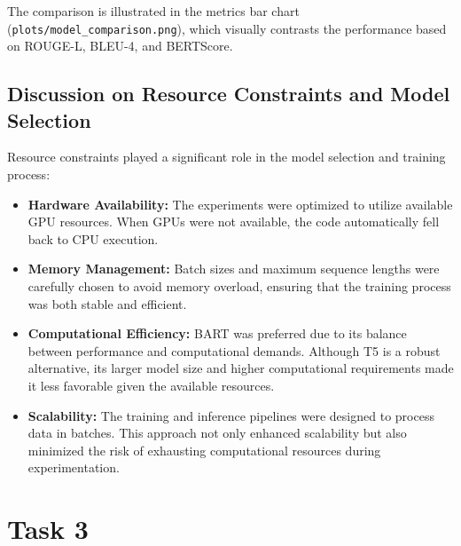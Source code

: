\documentclass{article}
\begin{document}
The comparison is illustrated in the metrics bar chart (\texttt{plots/model\_comparison.png}), which visually contrasts the performance based on ROUGE-L, BLEU-4, and BERTScore.

\subsection{Discussion on Resource Constraints and Model Selection}
Resource constraints played a significant role in the model selection and training process:
\begin{itemize}
    \item \textbf{Hardware Availability:} The experiments were optimized to utilize available GPU resources. When GPUs were not available, the code automatically fell back to CPU execution.
    \item \textbf{Memory Management:} Batch sizes and maximum sequence lengths were carefully chosen to avoid memory overload, ensuring that the training process was both stable and efficient.
    \item \textbf{Computational Efficiency:} BART was preferred due to its balance between performance and computational demands. Although T5 is a robust alternative, its larger model size and higher computational requirements made it less favorable given the available resources.
    \item \textbf{Scalability:} The training and inference pipelines were designed to process data in batches. This approach not only enhanced scalability but also minimized the risk of exhausting computational resources during experimentation.
\end{itemize}

\section{Task 3}
\end{document}
